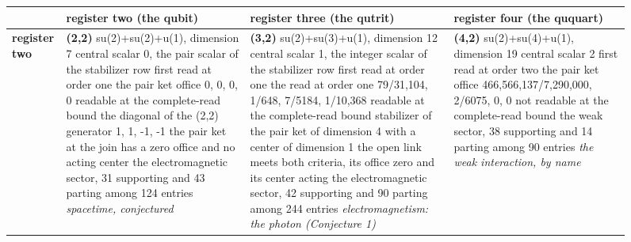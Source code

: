 \begin{figure}[htbp]\centering
\scriptsize
\setlength{\tabcolsep}{3pt}
\begin{adjustbox}{max width=\linewidth}\begin{tabular}{|p{14mm}|p{44mm}|p{44mm}|p{44mm}|}
\hline
 & \textbf{register two} (the qubit) & \textbf{register three} (the qutrit) & \textbf{register four} (the ququart) \\ \hline
\textbf{register two} & \textbf{(2,2)} \newline su(2)+su(2)+u(1), dimension 7 \newline central scalar 0, the pair scalar of the stabilizer row \newline first read at order one \newline the pair ket office 0, 0, 0, 0 \newline readable at the complete-read bound \newline the diagonal of the (2,2) generator 1, 1, -1, -1 \newline the pair ket at the join has a zero office and no acting center \newline the electromagnetic sector, 31 supporting and 43 parting among 124 entries \newline \emph{spacetime, conjectured} & \textbf{(3,2)} \newline su(2)+su(3)+u(1), dimension 12 \newline central scalar 1, the integer scalar of the stabilizer row \newline first read at order one \newline the read at order one 79/31,104, 1/648, 7/5184, 1/10,368 \newline readable at the complete-read bound \newline stabilizer of the pair ket of dimension 4 with a center of dimension 1 \newline the open link meets both criteria, its office zero and its center acting \newline the electromagnetic sector, 42 supporting and 90 parting among 244 entries \newline \emph{electromagnetism: the photon (Conjecture 1)} & \textbf{(4,2)} \newline su(2)+su(4)+u(1), dimension 19 \newline central scalar 2 \newline first read at order two \newline the pair ket office 466,566,137/7,290,000, 2/6075, 0, 0 \newline not readable at the complete-read bound \newline the weak sector, 38 supporting and 14 parting among 90 entries \newline \emph{the weak interaction, by name} \\ \hline

\end{tabular}
\end{adjustbox}
\end{figure}
